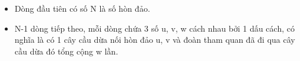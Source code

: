 \begin{itemize}
	\item Dòng đầu tiên có số N là số hòn đảo.
	\item N-1 dòng tiếp theo, mỗi dòng chứa 3 số u, v, w cách nhau bởi 1 dấu cách, có nghĩa là có 1 cây cầu dừa nối hòn đảo u, v và đoàn tham quan đã đi qua cây cầu dừa đó tổng cộng w lần.
\end{itemize}